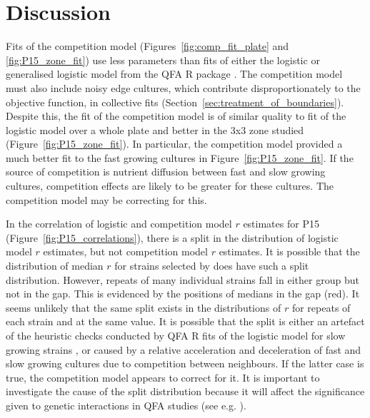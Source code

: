 \graphicspath{{images/}}

\section{Discussion}
\label{sec:discussion}

Fits of the competition model (Figures~\ref{fig:comp_fit_plate} and
\ref{fig:P15_zone_fit}) use less parameters than fits of either the
logistic or generalised logistic model from the QFA R package
\citep{qfa2016}. The competition model must also include noisy edge
cultures, which contribute disproportionately to the objective
function, in collective fits
(Section~\ref{sec:treatment_of_boundaries}). Despite this, the fit of
the competition model is of similar quality to fit of the logistic
model over a whole plate and better in the 3x3 zone studied
(Figure~\ref{fig:P15_zone_fit}). In particular, the competition model
provided a much better fit to the fast growing cultures in
Figure~\ref{fig:P15_zone_fit}. If the source of competition is
nutrient diffusion between fast and slow growing cultures, competition
effects are likely to be greater for these cultures. The competition
model may be correcting for this.

In the correlation of logistic and competition model \(r\) estimates
for P15 (Figure~\ref{fig:P15_correlations}), there is a split in the
distribution of logistic model \(r\) estimates, but not competition
model \(r\) estimates. It is possible that the distribution of median
\(r\) for strains selected by \citet{Addinall2011} does have such a
split distribution. However, repeats of many individual strains fall
in either group but not in the gap. This is evidenced by the positions
of medians in the gap (red). It seems unlikely that the same split
exists in the distributions of \(r\) for repeats of each strain and at
the same value. It is possible that the split is either an artefact of
the heuristic checks conducted by QFA R fits of the logistic model for
slow growing strains \citep{qfa2016}, or caused by a relative
acceleration and deceleration of fast and slow growing cultures due to
competition between neighbours. If the latter case is true, the
competition model appears to correct for it. It is important to
investigate the cause of the split distribution because it will affect
the significance given to genetic interactions in QFA studies (see
e.g. \citet{Addinall2011}).

